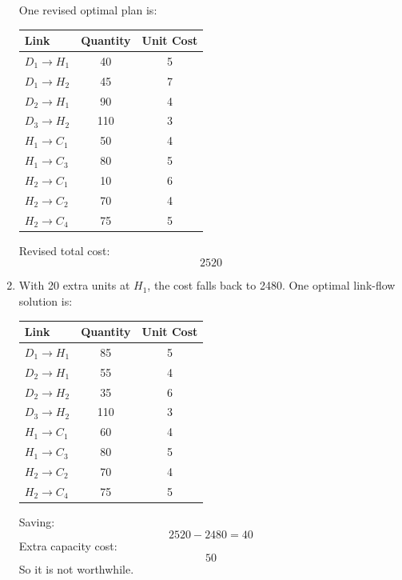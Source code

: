 \documentclass[11pt,a4paper]{article}
\begin{document}
\begin{enumerate}
One revised optimal plan is:

\begin{center}
\begin{tabular}{lcc}
\toprule
Link & Quantity & Unit Cost \\
\midrule
$D_1 \to H_1$ & 40 & 5 \\
$D_1 \to H_2$ & 45 & 7 \\
$D_2 \to H_1$ & 90 & 4 \\
$D_3 \to H_2$ & 110 & 3 \\
$H_1 \to C_1$ & 50 & 4 \\
$H_1 \to C_3$ & 80 & 5 \\
$H_2 \to C_1$ & 10 & 6 \\
$H_2 \to C_2$ & 70 & 4 \\
$H_2 \to C_4$ & 75 & 5 \\
\bottomrule
\end{tabular}
\end{center}

Revised total cost:
\[
2520
\]

\item With 20 extra units at $H_1$, the cost falls back to 2480. One optimal link-flow solution is:

\begin{center}
\begin{tabular}{lcc}
\toprule
Link & Quantity & Unit Cost \\
\midrule
$D_1 \to H_1$ & 85 & 5 \\
$D_2 \to H_1$ & 55 & 4 \\
$D_2 \to H_2$ & 35 & 6 \\
$D_3 \to H_2$ & 110 & 3 \\
$H_1 \to C_1$ & 60 & 4 \\
$H_1 \to C_3$ & 80 & 5 \\
$H_2 \to C_2$ & 70 & 4 \\
$H_2 \to C_4$ & 75 & 5 \\
\bottomrule
\end{tabular}
\end{center}

Saving:
\[
2520-2480=40
\]
Extra capacity cost:
\[
50
\]
So it is not worthwhile.
\end{enumerate}
\end{document}
